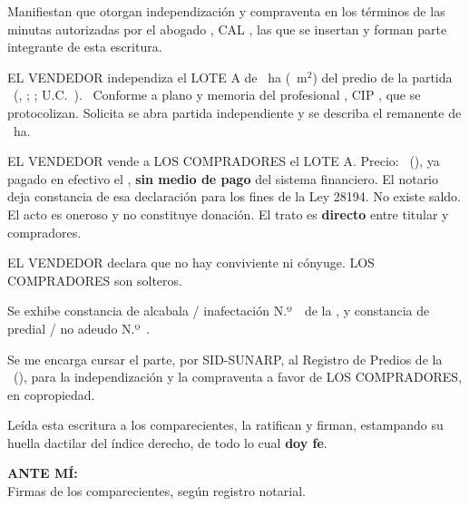 \documentclass[12pt,a4paper]{article}
\begin{document}
Manifiestan que otorgan independización y compraventa en los términos de las minutas autorizadas por el abogado \AbogadoNombre, CAL \ColegiaturaAbogado, las que se insertan y forman parte integrante de esta escritura.

EL VENDEDOR independiza el LOTE A de \AreaIndependizarHa\ ha (\AreaIndependizarMetros\ m$^2$) del predio de la partida \PartidaMatriz\ (\OficinaRegistral, \ZonaRegistral; \UbicacionRegistral; U.C.\ \UnidadCatastral). \CriterioRecorte\ Conforme a plano y memoria del profesional \IngenieroNombre, CIP \IngenieroCIP, que se protocolizan. Solicita se abra partida independiente y se describa el remanente de \AreaRemanenteHa\ ha.

EL VENDEDOR vende a LOS COMPRADORES el LOTE A. Precio: \MontoPago\ (\MontoPagoLetras), ya pagado en efectivo el \FechaPago, \textbf{sin medio de pago} del sistema financiero. El notario deja constancia de esa declaración para los fines de la Ley 28194. No existe saldo. El acto es oneroso y no constituye donación. El trato es \textbf{directo} entre titular y compradores.

EL VENDEDOR declara que no hay conviviente ni cónyuge. LOS COMPRADORES son solteros.

Se exhibe constancia de alcabala / inafectación N.º\ \linea[3.2cm]\ de la \Municipalidad, y constancia de predial / no adeudo N.º\ \linea[3.2cm].

Se me encarga cursar el parte, por SID-SUNARP, al Registro de Predios de la \OficinaRegistral\ (\ZonaRegistral), para la independización y la compraventa a favor de LOS COMPRADORES, en copropiedad.

Leída esta escritura a los comparecientes, la ratifican y firman, estampando su huella dactilar del índice derecho, de todo lo cual \textbf{doy fe}.

\vspace{0.9em}
\noindent \textbf{ANTE MÍ:}\\[0.15em]
Firmas de los comparecientes, según registro notarial.

\vspace{0.25em}
\end{document}
